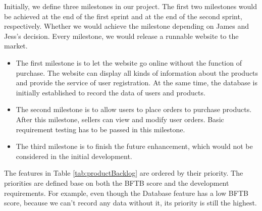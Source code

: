 \documentclass{report}
\begin{document}
Initially, we define three milestones in our project. The first two milestones would be achieved at the end of the first sprint and at the end of the second sprint, respectively. Whether we would achieve the milestone depending on James and Jess's decision. Every milestone, we would release a runnable website to the market.
\begin{itemize}
\item The first milestone is to let the website go online without the function of purchase. The website can display all kinds of information about the products and provide the service of user registration. At the same time, the database is initially established to record the data of users and products.
\item The second milestone is to allow users to place orders to purchase products. After this milestone, sellers can view and modify user orders. Basic requirement testing has to be passed in this milestone.
\item The third milestone is to finish the future enhancement, which would not be considered in the initial development.
\end{itemize}

The features in Table \ref{tab:productBacklog} are ordered by their priority. The priorities are defined base on both the BFTB score and the development requirements. For example, even though the Database feature has a low BFTB score, because we can't record any data without it, its priority is still the highest.
\end{document}
